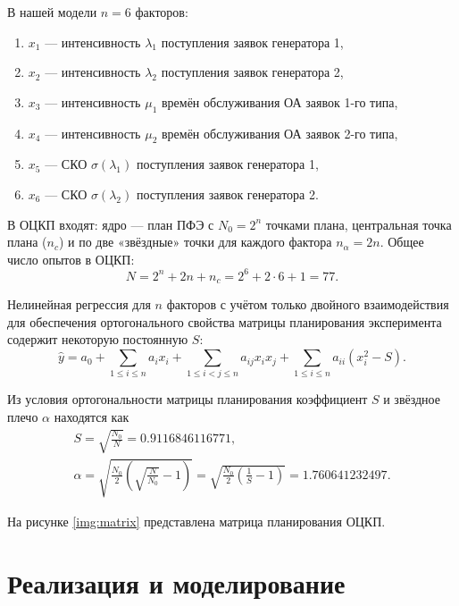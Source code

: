 \documentclass[a4paper, 14pt]{extreport}
\begin{document}
\begin{MainPart}
В нашей модели $n = 6$ факторов:
\begin{enumerate}
	\item $x_1$ — интенсивность $\lambda_1$ поступления заявок генератора 1,
	\item $x_2$ — интенсивность $\lambda_2$ поступления заявок генератора 2,
	\item $x_3$ — интенсивность $\mu_1$ времён обслуживания ОА заявок 1-го типа,
	\item $x_4$ — интенсивность $\mu_2$ времён обслуживания ОА заявок 2-го типа,
	\item $x_5$ — СКО $\sigma(\lambda_1)$ поступления заявок генератора 1,
	\item $x_6$ — СКО $\sigma(\lambda_2)$ поступления заявок генератора 2.
\end{enumerate}

В ОЦКП входят: ядро — план ПФЭ с $N_0 = 2^n$ точками плана, центральная точка плана ($n_c$) и по две «звёздные» точки для каждого фактора $n_\alpha = 2n$.
Общее число опытов в ОЦКП:
\begin{equation}
	N = 2^n + 2n + n_c = 2^6 + 2 \cdot 6 + 1 = 77.
\end{equation}

Нелинейная регрессия для $n$ факторов с учётом только двойного взаимодействия для обеспечения ортогонального свойства матрицы планирования эксперимента содержит некоторую постоянную $S$:
\begin{equation}
	\hat y = a_0 + \sum_{1 \leqslant i \leqslant n}a_ix_i + \sum_{1 \leqslant i < j \leqslant n}a_{ij}x_ix_j + \sum_{1 \leqslant i \leqslant n}a_{ii}(x_i^2-S).
\end{equation}

Из условия ортогональности матрицы планирования коэффициент $S$ и звёздное плечо $\alpha$ находятся как
\begin{gather}
	S = \sqrt{\frac {N_0}N} = 0.9116846116771, \\
	\alpha = \sqrt{\frac {N_0}2 \left(\sqrt{\frac N{N_0}} - 1\right)} = \sqrt{\frac {N_0}2 \left(\frac1S - 1\right)} = 1.760641232497.
\end{gather}

На рисунке \ref{img:matrix} представлена матрица планирования ОЦКП.


\section{Реализация и моделирование}



\end{MainPart}
\end{document}
